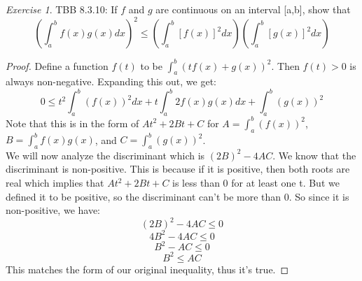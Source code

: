 \documentclass[12pt,oneside]{amsart}
\theoremstyle{definition}
\theoremstyle{remark}
\newtheorem{exer}{Exercise}
\numberwithin{equation}{exer}
\begin{document}
\newpage

\begin{exer}
TBB 8.3.10: If $f$ and $g$ are continuous on an interval [a,b], show that 
$$(\int_{a}^{b}f(x)g(x)dx)^2\leq (\int_{a}^{b}[f(x)]^2dx)(\int_{a}^{b}[g(x)]^2dx)$$
\end{exer}
\begin{proof}
Define a function $f(t)$ to be $\int_{a}^{b}(tf(x)+g(x))^2$. Then $f(t)>0$ is always non-negative. Expanding this out, we get:
$$0\leq t^2\int_{a}^{b}(f(x))^2dx+t\int_{a}^{b}2f(x)g(x)dx+\int_{a}^{b}(g(x))^2$$
Note that this is in the form of $At^2+2Bt+C$ for $A=\int_{a}^{b}(f(x))^2$, $B=\int_{a}^{b}f(x)g(x)$, and $C=\int_{a}^{b}(g(x))^2$. \\
We will now analyze the discriminant which is $(2B)^2-4AC$. We know that the discriminant is non-positive. This is because if it is positive, then both roots are real which implies that $At^2+2Bt+C$ is less than 0 for at least one t. But we defined it to be positive, so the discriminant can't be more than 0. So since it is non-positive, we have:
$$(2B)^2-4AC\leq 0$$
$$4B^2-4AC\leq 0$$
$$B^2-AC\leq 0$$
$$B^2\leq AC$$
This matches the form of our original inequality, thus it's true.
\end{proof}

\iffalse
\begin{exer}
5.4.6: (a) Prove that for $n\in \mathbb{N}$, we have $$\sum_{k=2}^{n}\frac{1}{k}\leq ln(n)\leq \sum_{k=1}^{n-1}\frac{1}{k}$$
(b) Prove that the limit $$\gamma := lim_{n\to \infty}(\sum_{k=1}^{n}\frac{1}{k}-ln(n))$$ exists.
\end{exer}
\begin{proof}
(a) If $n\in \mathbb{N}$, then $0\leq ln(n)\leq \infty$.

\end{proof}
\begin{proof}
(b) If we look at a graph of $\frac{1}{x}-ln(x)$ we see that it is decreasing. We can write this as:
$$\frac{1}{k}-ln(k)-\frac{1}{k-1}+ln(k-1)$$
For $\frac{1}{k}$ and $\frac{1}{k-1}$ all terms cancel except for $\frac{1}{k}$. Simplifying, we get:
$$=\frac{1}{k}+ln(\frac{k-1}{k})$$
For all $k\in \mathbb{N}$, this value is less than 0 and progressively becomes more negative. %
\end{proof}
\fi
\end{document}
